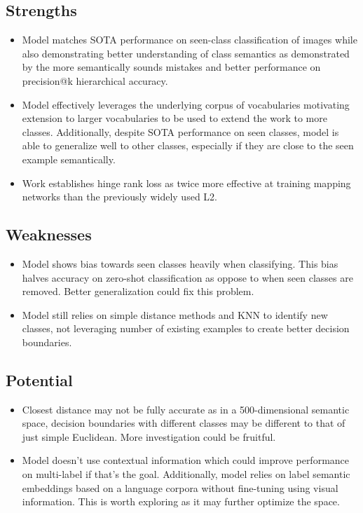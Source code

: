 \documentclass{article}
\begin{document}
\subsection{Strengths}
\begin{itemize}
    \item Model matches SOTA performance on seen-class classification of images while also demonstrating better understanding of class semantics as demonstrated by the more semantically sounds mistakes and better performance on precision@k hierarchical accuracy.
    \item Model effectively leverages the underlying corpus of vocabularies motivating extension to larger vocabularies to be used to extend the work to more classes. Additionally, despite SOTA performance on seen classes, model is able to generalize well to other classes, especially if they are close to the seen example semantically.
    \item Work establishes hinge rank loss as twice more effective at training mapping networks than the previously widely used L2.
\end{itemize}

\subsection{Weaknesses}
\begin{itemize}
    \item Model shows bias towards seen classes heavily when classifying. This bias halves accuracy on zero-shot classification as oppose to when seen classes are removed. Better generalization could fix this problem.
    \item Model still relies on simple distance methods and KNN to identify new classes, not leveraging number of existing examples to create better decision boundaries.
\end{itemize}

\subsection{Potential}
\begin{itemize}
    \item Closest distance may not be fully accurate as in a 500-dimensional semantic space, decision boundaries with different classes may be different to that of just simple Euclidean. More investigation could be fruitful.
    \item Model doesn't use contextual information which could improve performance on multi-label if that's the goal. Additionally, model relies on label semantic embeddings based on a language corpora without fine-tuning using visual information. This is worth exploring as it may further optimize the space.
\end{itemize}
\end{document}
